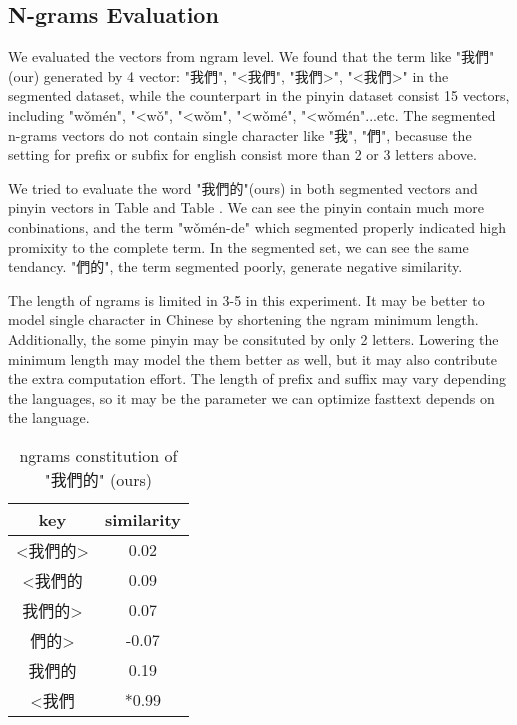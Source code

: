
\subsection{N-grams Evaluation}

We evaluated the vectors from ngram level. We found that the term like "我們"(our) generated by 4 vector: "我們", "<我們", "我們>", "<我們>" in the segmented dataset,
while the counterpart in the pinyin dataset consist 15 vectors, including "wǒmén", "<wǒ", "<wǒm", "<wǒmé", "<wǒmén"...etc. 
The segmented n-grams vectors do not contain single character like "我", "們", becasuse the setting for prefix or subfix for english consist more than 2 or 3 letters above.

We tried to evaluate the word "我們的"(ours) in both segmented vectors and pinyin vectors in Table \cite{table:ngrams-seg} and Table \cite{table:ngrams-pinyin}. 
We can see the pinyin contain much more conbinations, and the term "wǒmén-de" which segmented properly indicated high promixity to the complete term. 
In the segmented set, we can see the same tendancy. "們的", the term segmented poorly, generate negative similarity. 

The length of ngrams is limited in 3-5 in this experiment. It may be better to model single character in Chinese by shortening the ngram minimum length.
Additionally, the some pinyin may be consituted by only 2 letters.  Lowering the minimum length may model the them better as well, but it may also contribute the extra computation effort.
The length of prefix and suffix may vary depending the languages, so it may be the parameter we can optimize fasttext depends on the language.

\begin{table}[]
\centering
\caption{ngrams constitution of "我們的" (ours)}
\label{table:ngrams-seg}
\begin{tabular}{|c|c|}
\hline
 key  &  similarity \\
\hline
<我們的>     &  0.02 \\
<我們的     &  0.09 \\
我們的>     &  0.07 \\
們的>     &  -0.07 \\
我們的     & 0.19   \\
<我們     &  *0.99   \\   
\hline
\end{tabular}
\end{table}

